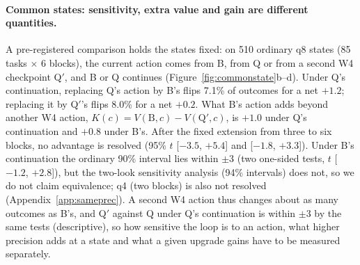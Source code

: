 \paragraph{Common states: sensitivity, extra value and gain are different quantities.} A pre-registered comparison holds the states fixed: on 510 ordinary q8 states (85 tasks $\times$ 6 blocks), the current action comes from B, from Q or from a second W4 checkpoint Q$'$, and B or Q continues (Figure~\ref{fig:commonstate}b--d). Under Q's continuation, replacing Q's action by B's flips 7.1\% of outcomes for a net $+1.2$\pp{}; replacing it by Q$'$'s flips 8.0\% for a net $+0.2$\pp{}. What B's action adds beyond another W4 action, $K(c)=V(\mathrm{B},c)-V(\mathrm{Q}',c)$, is $+1.0$\pp{} under Q's continuation and $+0.8$\pp{} under B's. After the fixed extension from three to six blocks, no advantage is resolved (95\% $t$ [$-3.5$, $+5.4$] and [$-1.8$, $+3.3$]). Under B's continuation the ordinary 90\% interval lies within $\pm$3\pp{} (two one-sided tests, $t$ [$-1.2$, $+2.8$]), but the two-look sensitivity analysis (94\% intervals) does not, so we do not claim equivalence; q4 (two blocks) is also not resolved (Appendix~\ref{app:sameprec}). A second W4 action thus changes about as many outcomes as B's, and Q$'$ against Q under Q's continuation is within $\pm$3\pp{} by the same tests (descriptive), so how sensitive the loop is to an action, what higher precision adds at a state and what a given upgrade gains have to be measured separately. %

